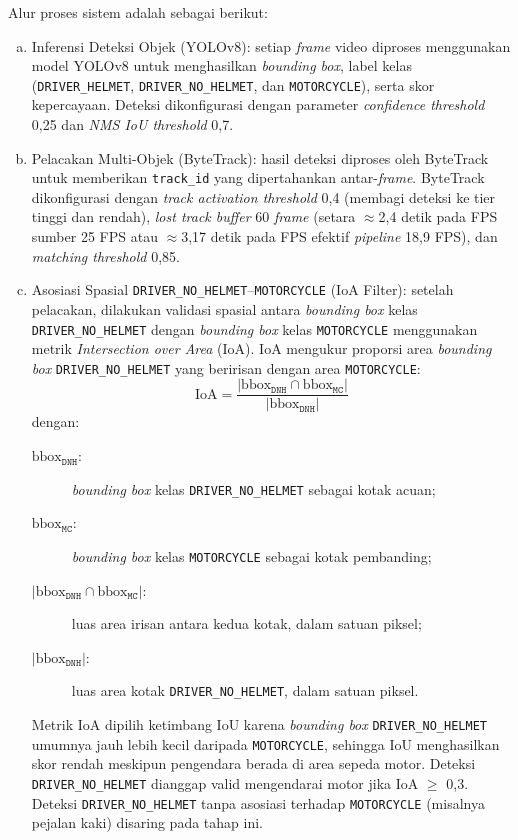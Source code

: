 Alur proses sistem adalah sebagai berikut:
\begin{enumerate}[a.]
  \item {Inferensi Deteksi Objek (YOLOv8)}: setiap \textit{frame} video diproses menggunakan model YOLOv8 untuk menghasilkan \textit{bounding box}, label kelas (\texttt{DRIVER\_HELMET}, \texttt{DRIVER\_NO\_HELMET}, dan \texttt{MOTORCYCLE}), serta skor kepercayaan. Deteksi dikonfigurasi dengan parameter \textit{confidence threshold} 0{,}25 dan \textit{NMS IoU threshold} 0{,}7.

  \item {Pelacakan Multi-Objek (ByteTrack)}: hasil deteksi diproses oleh ByteTrack untuk memberikan \texttt{track\_id} yang dipertahankan antar-\textit{frame}. ByteTrack dikonfigurasi dengan \textit{track activation threshold} 0{,}4 (membagi deteksi ke tier tinggi dan rendah), \textit{lost track buffer} 60 \textit{frame} (setara $\approx$2{,}4 detik pada FPS sumber 25 FPS atau $\approx$3{,}17 detik pada FPS efektif \textit{pipeline} 18{,}9 FPS), dan \textit{matching threshold} 0{,}85.

  \item {Asosiasi Spasial \texttt{DRIVER\_NO\_HELMET}--\texttt{MOTORCYCLE} (IoA Filter)}: setelah pelacakan, dilakukan validasi spasial antara \textit{bounding box} kelas \texttt{DRIVER\_NO\_HELMET} dengan \textit{bounding box} kelas \texttt{MOTORCYCLE} menggunakan metrik \textit{Intersection over Area} (IoA). IoA mengukur proporsi area \textit{bounding box} \texttt{DRIVER\_NO\_HELMET} yang beririsan dengan area \texttt{MOTORCYCLE}:
    \begin{equation}
      \label{eq:ioa-dnh-mc}
      \text{IoA} = \frac{|\text{bbox}_{\texttt{DNH}} \cap \text{bbox}_{\texttt{MC}}|}{|\text{bbox}_{\texttt{DNH}}|}
    \end{equation}
    \noindent dengan:
    \begin{description}
      \item[$\text{bbox}_{\texttt{DNH}}$:] \textit{bounding box} kelas \texttt{DRIVER\_NO\_HELMET} sebagai kotak acuan;
      \item[$\text{bbox}_{\texttt{MC}}$:] \textit{bounding box} kelas \texttt{MOTORCYCLE} sebagai kotak pembanding;
      \item[$|\text{bbox}_{\texttt{DNH}} \cap \text{bbox}_{\texttt{MC}}|$:] luas area irisan antara kedua kotak, dalam satuan piksel;
      \item[$|\text{bbox}_{\texttt{DNH}}|$:] luas area kotak \texttt{DRIVER\_NO\_HELMET}, dalam satuan piksel.
    \end{description}
    Metrik IoA dipilih ketimbang IoU karena \textit{bounding box} \texttt{DRIVER\_NO\_HELMET} umumnya jauh lebih kecil daripada \texttt{MOTORCYCLE}, sehingga IoU menghasilkan skor rendah meskipun pengendara berada di area sepeda motor. Deteksi \texttt{DRIVER\_NO\_HELMET} dianggap valid mengendarai motor jika IoA $\geq$ 0{,}3. Deteksi \texttt{DRIVER\_NO\_HELMET} tanpa asosiasi terhadap \texttt{MOTORCYCLE} (misalnya pejalan kaki) disaring pada tahap ini.


\end{enumerate}
